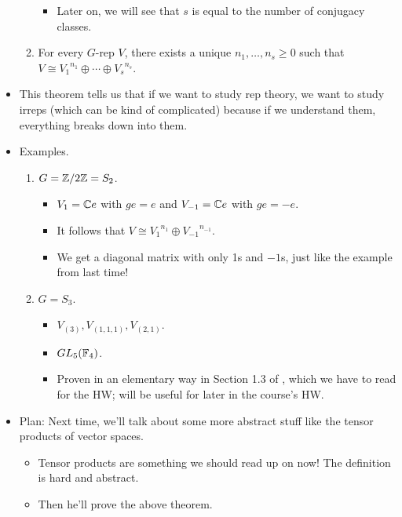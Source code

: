 \documentclass[../notes.tex]{subfiles}
\begin{document}
\begin{itemize}
\begin{enumerate}
        \begin{itemize}
            \item Later on, we will see that $s$ is equal to the number of conjugacy classes.
        \end{itemize}
        \item For every $G$-rep $V$, there exists a unique $n_1,\dots,n_s\geq 0$ such that $V\cong{V_1}^{n_1}\oplus\cdots\oplus{V_s}^{n_s}$.
    \end{enumerate}
    \item This theorem tells us that if we want to study rep theory, we want to study irreps (which can be kind of complicated) because if we understand them, everything breaks down into them.
    \item Examples.
    \begin{enumerate}
        \item $G=\mathbb{Z}/2\mathbb{Z}=S_2$.
        \begin{itemize}
            \item $V_1=\mathbb{C} e$ with $ge=e$ and $V_{-1}=\mathbb{C} e$ with $ge=-e$.
            \item It follows that $V\cong{V_1}^{n_1}\oplus{V_{-1}}^{n_{-1}}$.
            \item We get a diagonal matrix with only 1s and $-1$s, just like the example from last time!
        \end{itemize}
        \item $G=S_3$.
        \begin{itemize}
            \item $V_{(3)},V_{(1,1,1)},V_{(2,1)}$.
            \item $GL_5(\mathbb{F}_4)$.
            \item Proven in an elementary way in Section 1.3 of \textcite{bib:FultonHarris}, which we have to read for the HW; will be useful for later in the course's HW.
        \end{itemize}
    \end{enumerate}
    \item Plan: Next time, we'll talk about some more abstract stuff like the tensor products of vector spaces.
    \begin{itemize}
        \item Tensor products are something we should read up on now! The definition is hard and abstract.
        \item Then he'll prove the above theorem.
    \end{itemize}
\end{itemize}
\end{document}
